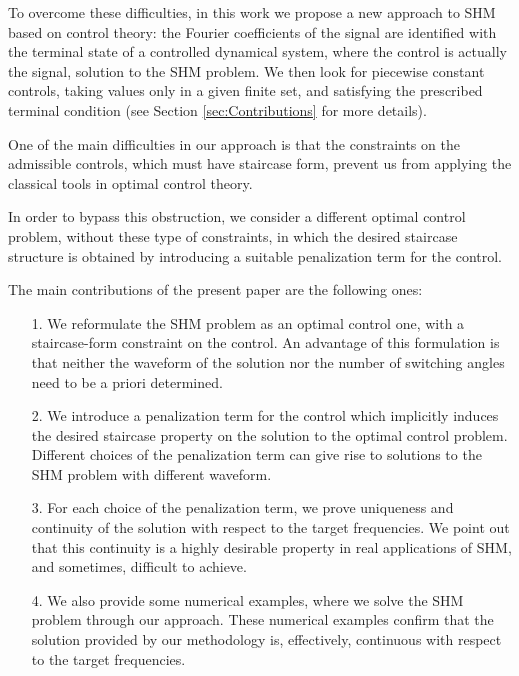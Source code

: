 \documentclass[9pt,shortpaper,twoside,web]{ieeecolor}
\begin{document}
To overcome these difficulties, in this work we propose a new approach to SHM based on control theory: the Fourier coefficients of the signal are identified with the terminal state of a controlled dynamical system, where the control is actually the signal, solution to the SHM problem. We then look for piecewise constant controls, taking values only in a given finite set, and satisfying the prescribed terminal condition (see Section \ref{sec:Contributions} for more details). 

%

One of the main difficulties in our approach is  that the constraints on the admissible controls, which must have staircase form,  prevent us from applying the classical tools in optimal control theory. 

In order to bypass this obstruction, we consider a different optimal control problem, without these type of constraints, in which the desired staircase structure is obtained by introducing a suitable penalization term for the control. 


The main contributions of the present paper are the following ones:
\begin{enumerate}
	\item[1.] We reformulate the SHM problem as an optimal control one, with a staircase-form constraint on the control. An advantage of this formulation is that neither the waveform of the solution nor the number of switching angles need to be a priori determined.  
	\item[2.] We introduce a penalization term for the control which implicitly induces the desired staircase property on the solution to the optimal control problem.  Different choices of the penalization term can give rise to  solutions to the SHM problem with different waveform.
	\item[3.] For each choice of the penalization term, we prove  uniqueness and continuity of the solution with respect to the target frequencies.  We point out that this continuity is a highly desirable property in real applications of SHM, and sometimes, difficult to achieve.
	\item[4.] We also provide some numerical examples, where we solve the SHM problem through our approach. These numerical examples confirm that the solution provided by our methodology is, effectively, continuous with respect to the target frequencies.
\end{enumerate}
\end{document}
